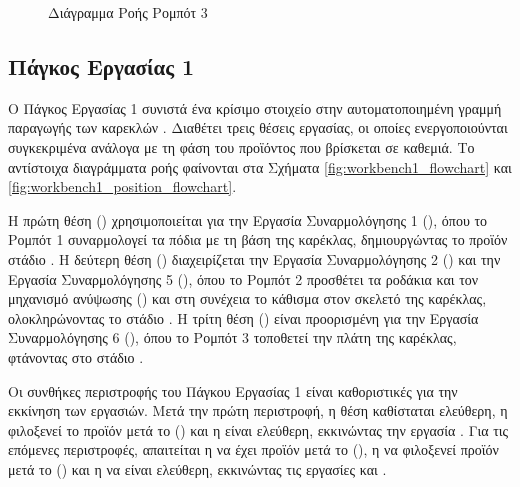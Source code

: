 \begin{figure}[H]
    \begin{center}
    \caption{Διάγραμμα Ροής Ρομπότ 3}
    \label{fig:robot3_flowchart}
    \end{center}
\end{figure}

\subsection{Πάγκος Εργασίας 1}
\noindent Ο Πάγκος Εργασίας 1 συνιστά ένα κρίσιμο στοιχείο στην αυτοματοποιημένη γραμμή παραγωγής των καρεκλών . Διαθέτει τρεις θέσεις εργασίας, οι οποίες ενεργοποιούνται συγκεκριμένα ανάλογα με τη φάση του προϊόντος που βρίσκεται σε καθεμιά. Το αντίστοιχα διαγράμματα ροής φαίνονται στα Σχήματα \ref{fig:workbench1_flowchart} και \ref{fig:workbench1_position_flowchart}.

Η πρώτη θέση () χρησιμοποιείται για την Εργασία Συναρμολόγησης 1 (), όπου το Ρομπότ 1 συναρμολογεί τα πόδια με τη βάση της καρέκλας, δημιουργώντας το προϊόν στάδιο . Η δεύτερη θέση () διαχειρίζεται την Εργασία Συναρμολόγησης 2 () και την Εργασία Συναρμολόγησης 5 (), όπου το Ρομπότ 2 προσθέτει τα ροδάκια και τον μηχανισμό ανύψωσης () και στη συνέχεια το κάθισμα στον σκελετό της καρέκλας, ολοκληρώνοντας το στάδιο . Η τρίτη θέση () είναι προορισμένη για την Εργασία Συναρμολόγησης 6 (), όπου το Ρομπότ 3 τοποθετεί την πλάτη της καρέκλας, φτάνοντας στο στάδιο .

Οι συνθήκες περιστροφής του Πάγκου Εργασίας 1 είναι καθοριστικές για την εκκίνηση των εργασιών. Μετά την πρώτη περιστροφή, η θέση  καθίσταται ελεύθερη, η  φιλοξενεί το προϊόν μετά το  () και η  είναι ελεύθερη, εκκινώντας την εργασία . Για τις επόμενες περιστροφές, απαιτείται η  να έχει προϊόν μετά το  (), η  να φιλοξενεί προϊόν μετά το  () και η  να είναι ελεύθερη, εκκινώντας τις εργασίες  και .


